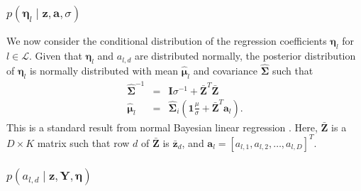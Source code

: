 \subsubsection{$p(\boldsymbol\eta_{l}\mid\mathbf{z},\mathbf{a},\sigma)$}

We now consider the conditional distribution of the regression coefficients
$\boldsymbol\eta_{l}$ for $l\in\mathcal{L}$. Given that $\boldsymbol\eta_{l}$
and $a_{l,d}$ are distributed normally, the posterior distribution
of $\boldsymbol\eta_{l}$ is normally distributed with mean $\hat{\boldsymbol\mu}_{l}$
and covariance $\hat{\mathbf{\Sigma}}$ such that %
\begin{eqnarray}
\hat{\mathbf{\Sigma}}^{-1} & = & \mathbf{I}\sigma^{-1}+\bar{\mathbf{Z}}^{T}\bar{\mathbf{Z}}\\
\hat{\boldsymbol\mu}_{l} & = & \hat{\mathbf{\Sigma}}_{i}\left(\mathbf{1}\frac{\mu}{\sigma}+\bar{\mathbf{Z}}^{T}\mathbf{a}_{l}\right).\end{eqnarray}
 This is a standard result from normal Bayesian linear regression
\citep{BishopPRML}. Here, $\bar{\mathbf{Z}}$ is a $D\times K$ matrix
such that row $d$ of $\mathbf{\bar{Z}}$ is $\bar{\mathbf{z}}_{d}$, and $\mathbf{a}_{l}=[a_{l,1},a_{l,2},\ldots,a_{l,D}]^{T}$.



\subsubsection{$p\left(a_{l,d}\mid\mathbf{z},\mathbf{Y},\mathbf{\boldsymbol\eta}\right)$}

